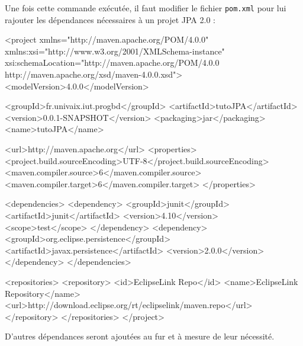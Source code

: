 \documentclass[a4paper,11pt]{article}
\begin{document}
Une fois cette commande exécutée, il faut modifier le fichier \texttt{pom.xml} pour lui rajouter les dépendances 
nécessaires à un projet JPA 2.0 :
\begin{code_xml}
<project xmlns="http://maven.apache.org/POM/4.0.0" 
         xmlns:xsi="http://www.w3.org/2001/XMLSchema-instance"
	       xsi:schemaLocation="http://maven.apache.org/POM/4.0.0 
	                           http://maven.apache.org/xsd/maven-4.0.0.xsd">
	<modelVersion>4.0.0</modelVersion>
	
	<groupId>fr.univaix.iut.progbd</groupId>
	<artifactId>tutoJPA</artifactId>
	<version>0.0.1-SNAPSHOT</version>
	<packaging>jar</packaging>
	<name>tutoJPA</name>
	
	<url>http://maven.apache.org</url>
	<properties>
		<project.build.sourceEncoding>UTF-8</project.build.sourceEncoding>
		<maven.compiler.source>6</maven.compiler.source>
		<maven.compiler.target>6</maven.compiler.target>
	</properties>
	
	<dependencies>
		<dependency>
			<groupId>junit</groupId>
			<artifactId>junit</artifactId>
			<version>4.10</version>
			<scope>test</scope>
		</dependency>
		<dependency>
			<groupId>org.eclipse.persistence</groupId>
			<artifactId>javax.persistence</artifactId>
			<version>2.0.0</version>
		</dependency>
	</dependencies>
	
	<repositories>
		<repository>
			<id>EclipseLink Repo</id>
			<name>EclipseLink Repository</name>
			<url>http://download.eclipse.org/rt/eclipselink/maven.repo</url>
		</repository>
	</repositories>
</project>
\end{code_xml}
D'autres dépendances seront ajoutées au fur et à mesure de leur nécessité.
\end{document}
